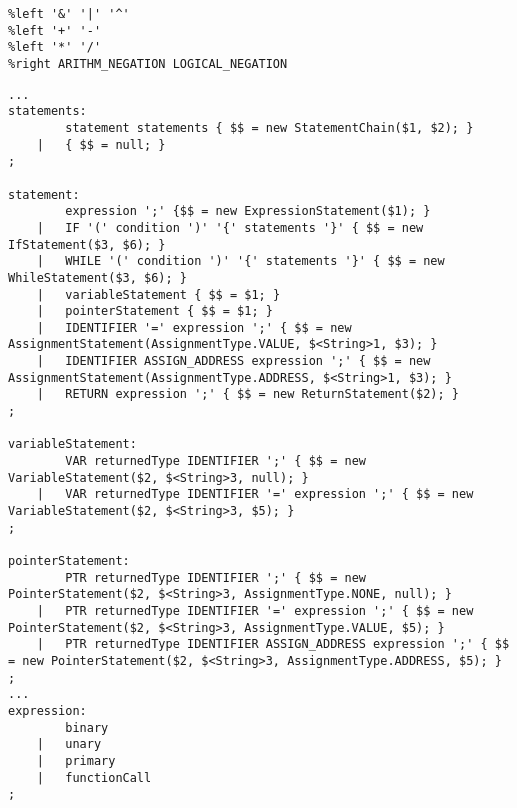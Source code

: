 \begin{lstlisting}[caption={Definicja priorytetów operacji w analizatorze syntaktycznym}, label={lst:parser-priorytety}]
%left EQUAL_EQUAL BANG_EQUAL LESS_EQUAL GREATER_EQUAL '<' '>' 
%left '&' '|' '^'
%left '+' '-'
%left '*' '/'
%right ARITHM_NEGATION LOGICAL_NEGATION
\end{lstlisting}

\begin{lstlisting}[caption={Przykładowy fragment gramatyki definiowanej w języku uCricket}, label={lst:parser-gramatyka}]
%%
...
statements:
        statement statements { $$ = new StatementChain($1, $2); }
    |   { $$ = null; }
;

statement: 
        expression ';' {$$ = new ExpressionStatement($1); }
    |   IF '(' condition ')' '{' statements '}' { $$ = new IfStatement($3, $6); }
    |   WHILE '(' condition ')' '{' statements '}' { $$ = new WhileStatement($3, $6); }
    |   variableStatement { $$ = $1; }
    |   pointerStatement { $$ = $1; }
    |   IDENTIFIER '=' expression ';' { $$ = new AssignmentStatement(AssignmentType.VALUE, $<String>1, $3); }
    |   IDENTIFIER ASSIGN_ADDRESS expression ';' { $$ = new AssignmentStatement(AssignmentType.ADDRESS, $<String>1, $3); }
    |   RETURN expression ';' { $$ = new ReturnStatement($2); }
;

variableStatement:
        VAR returnedType IDENTIFIER ';' { $$ = new VariableStatement($2, $<String>3, null); }
    |   VAR returnedType IDENTIFIER '=' expression ';' { $$ = new VariableStatement($2, $<String>3, $5); }
;

pointerStatement:
        PTR returnedType IDENTIFIER ';' { $$ = new PointerStatement($2, $<String>3, AssignmentType.NONE, null); }
    |   PTR returnedType IDENTIFIER '=' expression ';' { $$ = new PointerStatement($2, $<String>3, AssignmentType.VALUE, $5); }
    |   PTR returnedType IDENTIFIER ASSIGN_ADDRESS expression ';' { $$ = new PointerStatement($2, $<String>3, AssignmentType.ADDRESS, $5); }
;
...
expression:
        binary
    |   unary
    |   primary
    |   functionCall
;


\end{lstlisting}
